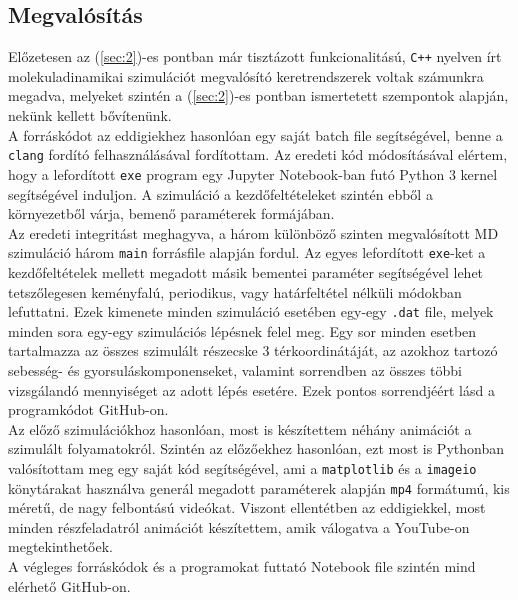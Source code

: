 \begin{multicols}{2}
\section{Megvalósítás} \label{sec:4}
Előzetesen az (\ref{sec:2})-es pontban már tisztázott funkcionalitású, \texttt{C++} nyelven írt molekuladinamikai szimulációt megvalósító keretrendszerek voltak számunkra megadva, melyeket szintén a (\ref{sec:2})-es pontban ismertetett szempontok alapján, nekünk kellett bővítenünk. \\
A forráskódot az eddigiekhez hasonlóan egy saját batch file segítségével, benne a \texttt{clang} fordító felhasználásával fordítottam. Az eredeti kód módosításával elértem, hogy a lefordított \texttt{exe} program egy Jupyter Notebook-ban futó Python 3 kernel segítségével induljon. A szimuláció a kezdőfeltételeket szintén ebből a környezetből várja, bemenő paraméterek formájában. \\
Az eredeti integritást meghagyva, a három különböző szinten megvalósított MD szimuláció három \texttt{main} forrásfile alapján fordul. Az egyes lefordított \texttt{exe}-ket a kezdőfeltételek mellett megadott másik bementei paraméter segítségével lehet tetszőlegesen keményfalú, periodikus, vagy határfeltétel nélküli módokban lefuttatni. Ezek kimenete minden szimuláció esetében egy-egy \texttt{.dat} file, melyek minden sora egy-egy szimulációs lépésnek felel meg. Egy sor minden esetben tartalmazza az összes szimulált részecske 3 térkoordinátáját, az azokhoz tartozó sebesség- és gyorsuláskomponenseket, valamint sorrendben az összes többi vizsgálandó mennyiséget az adott lépés esetére. Ezek pontos sorrendjéért lásd a programkódot GitHub-on\cite{github}. \\
Az előző szimulációkhoz hasonlóan, most is készítettem néhány animációt a szimulált folyamatokról. Szintén az előzőekhez hasonlóan, ezt most is Pythonban valósítottam meg egy saját kód segítségével, ami a \texttt{matplotlib} és a \texttt{imageio} könytárakat használva generál megadott paraméterek alapján \texttt{mp4} formátumú, kis méretű, de nagy felbontású videókat. Viszont ellentétben az eddigiekkel, most minden részfeladatról animációt készítettem, amik válogatva a YouTube-on megtekinthetőek\cite{yt}. \\
A végleges forráskódok és a programokat futtató Notebook file szintén mind elérhető GitHub-on\cite{github}.


\end{multicols}
